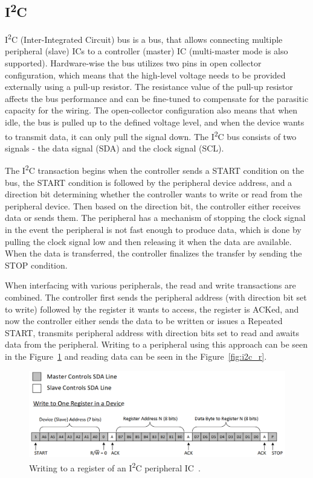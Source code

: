 \subsection{I\textsuperscript{2}C}
\label{subsec:i2c}
I\textsuperscript{2}C (Inter-Integrated Circuit) bus is a bus, that allows connecting multiple peripheral (slave) ICs to a controller (master) IC (multi-master mode is also supported)\cite{sfuptownmaker_i2c_2021}.
Hardware-wise the bus utilizes two pins in open collector configuration, which means that the high-level voltage needs to be provided externally using a pull-up resistor.
The resistance value of the pull-up resistor affects the bus performance and can be fine-tuned to compensate for the parasitic capacity for the wiring.
The open-collector configuration also means that when idle, the bus is pulled up to the defined voltage level, and when the device wants to transmit data, it can only pull the signal down.
The I\textsuperscript{2}C bus consists of two signals - the data signal (SDA) and the clock signal (SCL).

The I\textsuperscript{2}C transaction begins when the controller sends a START condition on the bus, the START condition is followed by the peripheral device address, and a direction bit determining whether the controller wants to write or read from the peripheral device\cite{sfuptownmaker_i2c_2021}.
Then based on the direction bit, the controller either receives data or sends them.
The peripheral has a mechanism of stopping the clock signal in the event the peripheral is not fast enough to produce data, which is done by pulling the clock signal low and then releasing it when the data are available.
When the data is transferred, the controller finalizes the transfer by sending the STOP condition.

When interfacing with various peripherals, the read and write transactions are combined\cite{valdez_understanding_2015}.
The controller first sends the peripheral address (with direction bit set to write) followed by the register it wants to access, the register is ACKed, and now the controller either sends the data to be written or issues a Repeated START, transmits peripheral address with direction bits set to read and awaits data from the peripheral.
Writing to a peripheral using this approach can be seen in the Figure~\ref{fig:i2c_w} and reading data can be seen in the Figure~\ref{fig:i2c_r}.

\begin{figure}[H]
    \centering
    \includegraphics[width=\textwidth]{obrazky/i2c_w}
    \caption{Writing to a register of an I\textsuperscript{2}C peripheral IC~\cite{valdez_understanding_2015}.}
    \label{fig:i2c_w}
\end{figure}

